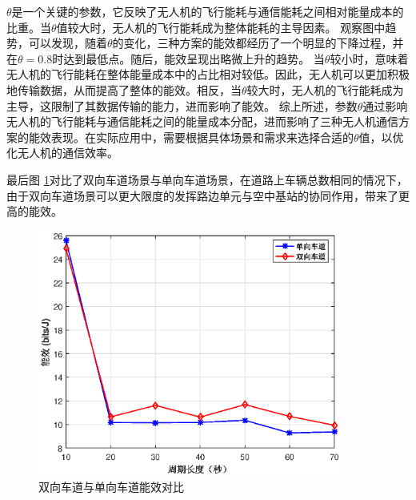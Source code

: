 $\theta$是一个关键的参数，它反映了无人机的飞行能耗与通信能耗之间相对能量成本的比重。当$\theta$值较大时，无人机的飞行能耗成为整体能耗的主导因素。
观察图中趋势，可以发现，随着$\theta$的变化，三种方案的能效都经历了一个明显的下降过程，并在$\theta=0.8$时达到最低点。随后，能效呈现出略微上升的趋势。
当$\theta$较小时，意味着无人机的飞行能耗在整体能量成本中的占比相对较低。因此，无人机可以更加积极地传输数据，从而提高了整体的能效。相反，当$\theta$较大时，无人机的飞行能耗成为主导，这限制了其数据传输的能力，进而影响了能效。
综上所述，参数$\theta$通过影响无人机的飞行能耗与通信能耗之间的能量成本分配，进而影响了三种无人机通信方案的能效表现。在实际应用中，需要根据具体场景和需求来选择合适的$\theta$值，以优化无人机的通信效率。

最后图 \ref{双向车道与单向车道的对比}对比了双向车道场景与单向车道场景，在道路上车辆总数相同的情况下，由于双向车道场景可以更大限度的发挥路边单元与空中基站的协同作用，带来了更高的能效。
\begin{figure}[H]
\centering
\includegraphics[width=10cm]{figures//chap4//双向车道.eps}
\caption{双向车道与单向车道能效对比}
\label{双向车道与单向车道的对比}
\end{figure}
